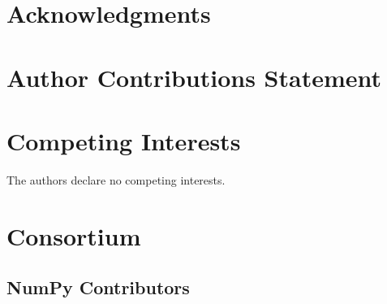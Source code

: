 \documentclass[fleqn,10pt]{wlscirep}
\begin{document}


\section*{Acknowledgments}


\section*{Author Contributions Statement}


\section*{Competing Interests}

The authors declare no competing interests.

\section*{Consortium}
\subsection*{NumPy Contributors}

\end{document}

